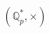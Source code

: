\documentclass[preview]{standalone}
\begin{document}
\begin{align*}
(\mathbb{Q}_{p}^{*}, \times)
\end{align*}
\end{document}
